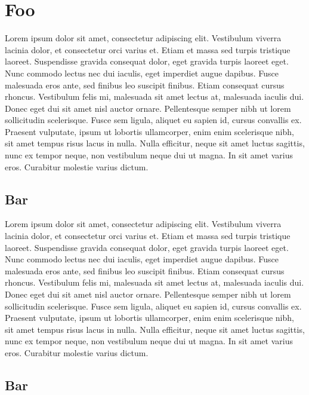 

\chapter{Foo}

Lorem ipsum dolor sit amet, consectetur adipiscing elit. Vestibulum viverra
lacinia dolor, et consectetur orci varius et. Etiam et massa sed turpis
tristique laoreet. Suspendisse gravida consequat dolor, eget gravida turpis
laoreet eget. Nunc commodo lectus nec dui iaculis, eget imperdiet augue dapibus.
Fusce malesuada eros ante, sed finibus leo suscipit finibus. Etiam consequat
cursus rhoncus. Vestibulum felis mi, malesuada sit amet lectus at, malesuada
iaculis dui. Donec eget dui sit amet nisl auctor ornare. Pellentesque semper
nibh ut lorem sollicitudin scelerisque. Fusce sem ligula, aliquet eu sapien id,
cursus convallis ex. Praesent vulputate, ipsum ut lobortis ullamcorper, enim
enim scelerisque nibh, sit amet tempus risus lacus in nulla. Nulla efficitur,
neque sit amet luctus sagittis, nunc ex tempor neque, non vestibulum neque dui
ut magna. In sit amet varius eros. Curabitur molestie varius dictum.

\section{Bar}

Lorem ipsum dolor sit amet, consectetur adipiscing elit. Vestibulum viverra
lacinia dolor, et consectetur orci varius et. Etiam et massa sed turpis
tristique laoreet. Suspendisse gravida consequat dolor, eget gravida turpis
laoreet eget. Nunc commodo lectus nec dui iaculis, eget imperdiet augue dapibus.
Fusce malesuada eros ante, sed finibus leo suscipit finibus. Etiam consequat
cursus rhoncus. Vestibulum felis mi, malesuada sit amet lectus at, malesuada
iaculis dui. Donec eget dui sit amet nisl auctor ornare. Pellentesque semper
nibh ut lorem sollicitudin scelerisque. Fusce sem ligula, aliquet eu sapien id,
cursus convallis ex. Praesent vulputate, ipsum ut lobortis ullamcorper, enim
enim scelerisque nibh, sit amet tempus risus lacus in nulla. Nulla efficitur,
neque sit amet luctus sagittis, nunc ex tempor neque, non vestibulum neque dui
ut magna. In sit amet varius eros. Curabitur molestie varius dictum.

\section{Bar}

